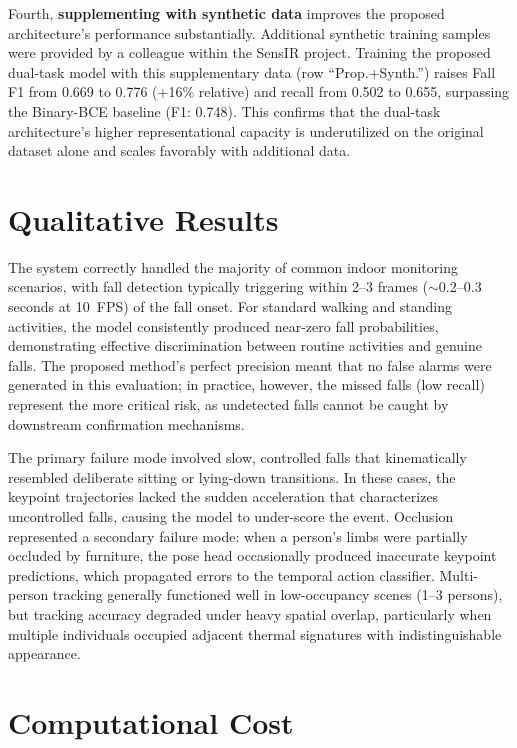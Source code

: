 Fourth, \textbf{supplementing with synthetic data} improves the proposed architecture's performance substantially. Additional synthetic training samples were provided by a colleague within the SensIR project. Training the proposed dual-task model with this supplementary data (row ``Prop.+Synth.'') raises Fall F1 from 0.669 to 0.776 (+16\% relative) and recall from 0.502 to 0.655, surpassing the Binary-BCE baseline (F1: 0.748). This confirms that the dual-task architecture's higher representational capacity is underutilized on the original dataset alone and scales favorably with additional data.

\section{Qualitative Results}
\label{sec:qualitative}

The system correctly handled the majority of common indoor monitoring scenarios, with fall detection typically triggering within 2--3 frames ($\sim$0.2--0.3 seconds at 10~FPS) of the fall onset. For standard walking and standing activities, the model consistently produced near-zero fall probabilities, demonstrating effective discrimination between routine activities and genuine falls. The proposed method's perfect precision meant that no false alarms were generated in this evaluation; in practice, however, the missed falls (low recall) represent the more critical risk, as undetected falls cannot be caught by downstream confirmation mechanisms.

The primary failure mode involved slow, controlled falls that kinematically resembled deliberate sitting or lying-down transitions. In these cases, the keypoint trajectories lacked the sudden acceleration that characterizes uncontrolled falls, causing the model to under-score the event. Occlusion represented a secondary failure mode: when a person's limbs were partially occluded by furniture, the pose head occasionally produced inaccurate keypoint predictions, which propagated errors to the temporal action classifier. Multi-person tracking generally functioned well in low-occupancy scenes (1--3 persons), but tracking accuracy degraded under heavy spatial overlap, particularly when multiple individuals occupied adjacent thermal signatures with indistinguishable appearance.

\section{Computational Cost}
\label{sec:cost}


